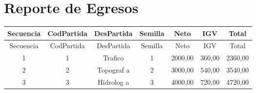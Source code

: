 \documentclass{article}
\begin{document}
\section{Reporte de Egresos}
\begin{longtable}{|c|c|c|c|c|c|c|}
\hline
Secuencia & CodPartida & DesPartida & Semilla & Neto & IGV & Total \\
\hline
\endfirsthead
\hline
Secuencia & CodPartida & DesPartida & Semilla & Neto & IGV & Total \\
\hline
\endhead
1 & 1 & Trafico & 1 & 2000,00 & 360,00 & 2360,00 \\
2 & 2 & Topograf a & 2 & 3000,00 & 540,00 & 3540,00 \\
3 & 3 & Hidrolog a & 3 & 4000,00 & 720,00 & 4720,00 \\
\hline
\end{longtable}
\end{document}
